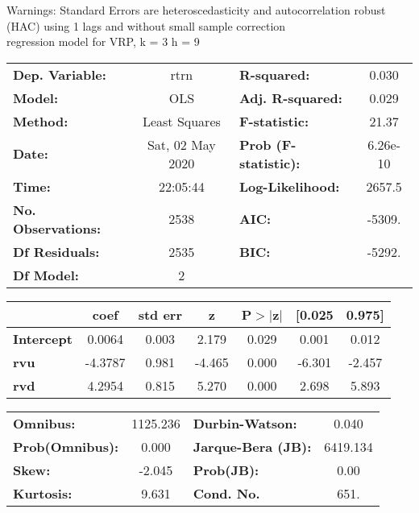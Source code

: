 Warnings: \newline
 [1] Standard Errors are heteroscedasticity and autocorrelation robust (HAC) using 1 lags and without small sample correction\\ 

regression model for VRP, k = 3 h = 9\begin{center}
\begin{tabular}{lclc}
\toprule
\textbf{Dep. Variable:}    &       rtrn       & \textbf{  R-squared:         } &     0.030   \\
\textbf{Model:}            &       OLS        & \textbf{  Adj. R-squared:    } &     0.029   \\
\textbf{Method:}           &  Least Squares   & \textbf{  F-statistic:       } &     21.37   \\
\textbf{Date:}             & Sat, 02 May 2020 & \textbf{  Prob (F-statistic):} &  6.26e-10   \\
\textbf{Time:}             &     22:05:44     & \textbf{  Log-Likelihood:    } &    2657.5   \\
\textbf{No. Observations:} &        2538      & \textbf{  AIC:               } &    -5309.   \\
\textbf{Df Residuals:}     &        2535      & \textbf{  BIC:               } &    -5292.   \\
\textbf{Df Model:}         &           2      & \textbf{                     } &             \\
\bottomrule
\end{tabular}
\begin{tabular}{lcccccc}
                   & \textbf{coef} & \textbf{std err} & \textbf{z} & \textbf{P$> |$z$|$} & \textbf{[0.025} & \textbf{0.975]}  \\
\midrule
\textbf{Intercept} &       0.0064  &        0.003     &     2.179  &         0.029        &        0.001    &        0.012     \\
\textbf{rvu}       &      -4.3787  &        0.981     &    -4.465  &         0.000        &       -6.301    &       -2.457     \\
\textbf{rvd}       &       4.2954  &        0.815     &     5.270  &         0.000        &        2.698    &        5.893     \\
\bottomrule
\end{tabular}
\begin{tabular}{lclc}
\textbf{Omnibus:}       & 1125.236 & \textbf{  Durbin-Watson:     } &    0.040  \\
\textbf{Prob(Omnibus):} &   0.000  & \textbf{  Jarque-Bera (JB):  } & 6419.134  \\
\textbf{Skew:}          &  -2.045  & \textbf{  Prob(JB):          } &     0.00  \\
\textbf{Kurtosis:}      &   9.631  & \textbf{  Cond. No.          } &     651.  \\
\bottomrule
\end{tabular}
\end{center}

